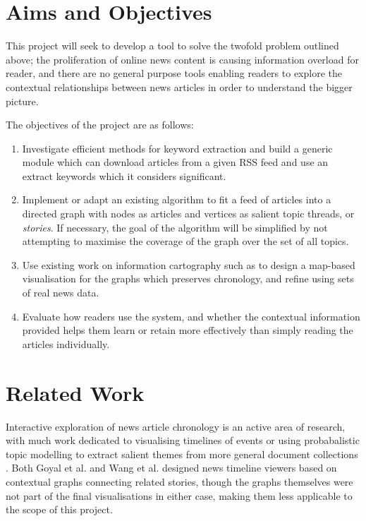 \section{Aims and Objectives}
This project will seek to develop a tool to solve the twofold problem outlined above; the proliferation of online news content is causing information overload for reader, and there are no general purpose tools enabling readers to explore the contextual relationships between news articles in order to understand the bigger picture.

The objectives of the project are as follows:
\begin{enumerate}
	\item Investigate efficient methods for keyword extraction and build a generic module which can download articles from a given RSS feed and use an extract keywords which it considers significant.
	\item Implement or adapt an existing algorithm to fit a feed of articles into a directed graph with nodes as articles and vertices as salient topic threads, or \textit{stories}. If necessary, the goal of the algorithm will be simplified by not attempting to maximise the coverage of the graph over the set of all topics.
	\item Use existing work on information cartography such as \cite{GeneratingInformationMaps, InteractiveTopicBasedVisualTextSummarizationAndAnalysis} to design a map-based visualisation for the graphs which preserves chronology, and refine using sets of real news data.
	\item Evaluate how readers use the system, and whether the contextual information provided helps them learn or retain more effectively than simply reading the articles individually.
\end{enumerate}

\section{Related Work}

Interactive exploration of news article chronology is an active area of research, with much work dedicated to visualising timelines of events \citep{StructuredSummarizationForNewsEvents, ExploringLongRunningNewsStoriesUsingWikipedia} or using probabalistic topic modelling to extract salient themes from more general document collections \citep{DiscoveringDiverseAndSalientThreads}. Both Goyal et al.\citep{ESTHETE} and Wang et al. \citep{nReader} designed news timeline viewers based on contextual graphs connecting related stories, though the graphs themselves were not part of the final visualisations in either case, making them less applicable to the scope of this project.

